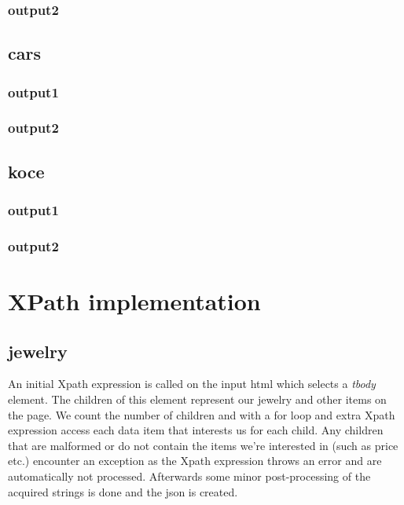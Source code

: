 \documentclass[runningheads]{llncs}
\begin{document}
\subsubsection{output2}
\subsection{cars}
\subsubsection{output1}
\subsubsection{output2}
\subsection{koce}
\subsubsection{output1}
\subsubsection{output2}
\section{XPath implementation}

\subsection{jewelry}
An initial Xpath expression is called on the input html which selects a \textit{tbody} element. The children of this element represent our jewelry and other items on the page. We count the number of children and with a for loop and extra Xpath expression access each data item that interests us for each child. Any children that are malformed or do not contain the items we're interested in (such as price etc.) encounter an exception as the Xpath expression throws an error and are automatically not processed. Afterwards some minor post-processing of the acquired strings is done and the json is created.
\end{document}

